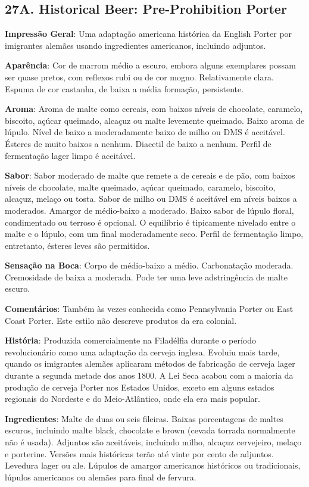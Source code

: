 \subsection*{27A. Historical Beer: Pre-Prohibition Porter}
\textbf{Impressão Geral}: Uma adaptação americana histórica da English Porter por imigrantes alemães usando ingredientes americanos, incluindo adjuntos.

\textbf{Aparência}: Cor de marrom médio a escuro, embora alguns exemplares possam ser quase pretos, com reflexos rubi ou de cor mogno. Relativamente clara. Espuma de cor castanha, de baixa a média formação, persistente.

\textbf{Aroma}: Aroma de malte como cereais, com baixos níveis de chocolate, caramelo, biscoito, açúcar queimado, alcaçuz ou malte levemente queimado. Baixo aroma de lúpulo. Nível de baixo a moderadamente baixo de milho ou DMS é aceitável. Ésteres de muito baixos a nenhum. Diacetil de baixo a nenhum. Perfil de fermentação lager limpo é aceitável.

\textbf{Sabor}: Sabor moderado de malte que remete a de cereais e de pão, com baixos níveis de chocolate, malte queimado, açúcar queimado, caramelo, biscoito, alcaçuz, melaço ou tosta. Sabor de milho ou DMS é aceitável em níveis baixos a moderados. Amargor de médio-baixo a moderado. Baixo sabor de lúpulo floral, condimentado ou terroso é opcional. O equilíbrio é tipicamente nivelado entre o malte e o lúpulo, com um final moderadamente seco. Perfil de fermentação limpo, entretanto, ésteres leves são permitidos.

\textbf{Sensação na Boca}: Corpo de médio-baixo a médio. Carbonatação moderada. Cremosidade de baixa a moderada. Pode ter uma leve adstringência de malte escuro.

\textbf{Comentários}: Também às vezes conhecida como Pennsylvania Porter ou East Coast Porter. Este estilo não descreve produtos da era colonial.

\textbf{História}: Produzida comercialmente na Filadélfia durante o período revolucionário como uma adaptação da cerveja inglesa. Evoluiu mais tarde, quando os imigrantes alemães aplicaram métodos de fabricação de cerveja lager durante a segunda metade dos anos 1800. A Lei Seca acabou com a maioria da produção de cerveja Porter nos Estados Unidos, exceto em alguns estados regionais do Nordeste e do Meio-Atlântico, onde ela era mais popular.

\textbf{Ingredientes}: Malte de duas ou seis fileiras. Baixas porcentagens de maltes escuros, incluindo malte black, chocolate e brown (cevada torrada normalmente não é usada). Adjuntos são aceitáveis, incluindo milho, alcaçuz cervejeiro, melaço e porterine. Versões mais históricas terão até vinte por cento de adjuntos. Levedura lager ou ale. Lúpulos de amargor americanos históricos ou tradicionais, lúpulos americanos ou alemães para final de fervura.

